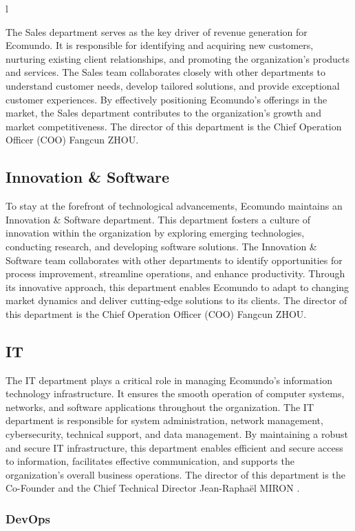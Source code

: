 l\documentclass[a4paper,12pt,twoside]{report}
\begin{document}
The Sales department serves as the key driver of revenue generation for Ecomundo. It is responsible for identifying and acquiring new customers, nurturing existing client relationships, and promoting the organization's products and services. The Sales team collaborates closely with other departments to understand customer needs, develop tailored solutions, and provide exceptional customer experiences. By effectively positioning Ecomundo's offerings in the market, the Sales department contributes to the organization's growth and market competitiveness. The director of this department is the Chief Operation Officer (COO) Fangcun ZHOU.

\subsection{Innovation \& Software}

To stay at the forefront of technological advancements, Ecomundo maintains an Innovation \& Software department. This department fosters a culture of innovation within the organization by exploring emerging technologies, conducting research, and developing software solutions. The Innovation \& Software team collaborates with other departments to identify opportunities for process improvement, streamline operations, and enhance productivity. Through its innovative approach, this department enables Ecomundo to adapt to changing market dynamics and deliver cutting-edge solutions to its clients. The director of this department is the Chief Operation Officer (COO) Fangcun ZHOU.

\subsection{IT}

The IT department plays a critical role in managing Ecomundo's information technology infrastructure. It ensures the smooth operation of computer systems, networks, and software applications throughout the organization. The IT department is responsible for system administration, network management, cybersecurity, technical support, and data management. By maintaining a robust and secure IT infrastructure, this department enables efficient and secure access to information, facilitates effective communication, and supports the organization's overall business operations. The director of this department is the Co-Founder and the Chief Technical Director Jean-Raphaël MIRON .


\subsubsection{DevOps}
\end{document}
